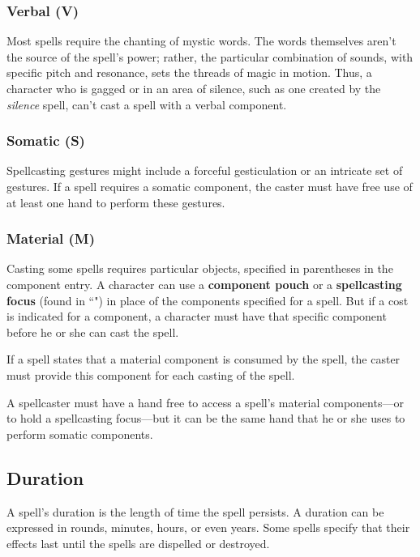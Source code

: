 \subsubsection{Verbal (V)}

Most spells require the chanting of mystic words. The words themselves aren't the source of the spell's power; rather, the particular combination of sounds, with specific pitch and resonance, sets the threads of magic in motion. Thus, a character who is gagged or in an area of silence, such as one created by the \textit{silence} spell, can't cast a spell with a verbal component.

\subsubsection{Somatic (S)}

Spellcasting gestures might include a forceful gesticulation or an intricate set of gestures. If a spell requires a somatic component, the caster must have free use of at least one hand to perform these gestures.

\subsubsection{Material (M)}

Casting some spells requires particular objects, specified in parentheses in the component entry. A character can use a \textbf{component pouch} or a \textbf{spellcasting focus} (found in “") in place of the components specified for a spell. But if a cost is indicated for a component, a character must have that specific component before he or she can cast the spell.

If a spell states that a material component is consumed by the spell, the caster must provide this component for each casting of the spell.

A spellcaster must have a hand free to access a spell's material components—or to hold a spellcasting focus—but it can be the same hand that he or she uses to perform somatic components.

\subsection{Duration}

A spell's duration is the length of time the spell persists. A duration can be expressed in rounds, minutes, hours, or even years. Some spells specify that their effects last until the spells are dispelled or destroyed.

